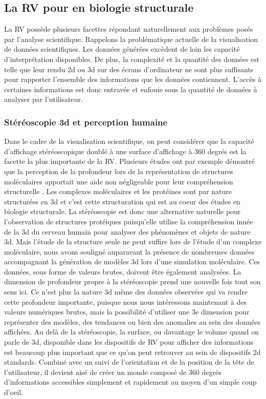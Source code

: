 \subsection{La RV pour en biologie structurale}

La RV possède plusieurs facettes répondant naturellement aux problèmes posés par l'analyse scientifique. Rappelons la problématique actuelle de la visualisation de données scientifiques. Les données générées excèdent de loin les capacité d'interprétation disponibles. De plus, la complexité et la quantité des données est telle que leur rendu 2d ou 3d sur des écrans d'ordinateur ne sont plus suffisants pour rapporter l'ensemble des informations que les données contiennent. L'accès à certaines informations est donc entravée et enfouie sous la quantité de données à analyser par l'utilisateur.

\subsubsection{Stéréoscopie 3d et perception humaine}

Dans le cadre de la visualisation scientifique, on peut considérer que la capacité d'affichage stéréoscopique doublé à une surface d'affichage à 360 degrés est la facette la plus importante de la RV. Plusieurs études ont par exemple démontré que la perception de la profondeur lors de la représentation de structures moléculaires apportait une aide non négligeable pour leur compréhension structurelle \cite{van_dam_immersive_2000,stone_immersive_2010,odonoghue_visualization_2010}. Les complexes moléculaires et les protéines sont par nature structurées en 3d et c'est cette structuration qui est au coeur des études en biologie structurale. La stéréoscopie est donc une alternative naturelle pour l'observation de structures protéiques puisqu'elle utilise la compréhension innée de la 3d du cerveau humain pour analyser des phénomènes et objets de nature 3d. 
Mais l'étude de la structure seule ne peut suffire lors de l'étude d'un complexe moléculaire, nous avons souligné auparavant la présence de nombreuses données accompagnant la génération de modèles 3d lors d'une simulation moléculaire. Ces données, sous forme de valeurs brutes, doivent être également analysées. La dimension de profondeur propre à la stéréoscopie prend une nouvelle fois tout son sens ici. Ce n'est plus la nature 3d même des données observées qui va rendre cette profondeur importante, puisque nous nous intéressons maintenant à des valeurs numériques brutes, mais la possibilité d'utiliser une 3e dimension pour représenter des modèles, des tendances ou bien des anomalies au sein des données affichées.
Au delà de la stéréoscopie, la surface, ou davantage le volume quand on parle de 3d, disponible dans les dispositifs de RV pour afficher des informations est beaucoup plus important que ce qu'on peut retrouver au sein de dispositifs 2d standards. Combiné avec un suivi de l'orientation et de la position de la tête de l'utilisateur, il devient aisé de créer un monde composé de 360 degrés d'informations accessibles simplement et rapidement au moyen d'un simple coup d'oeil.

